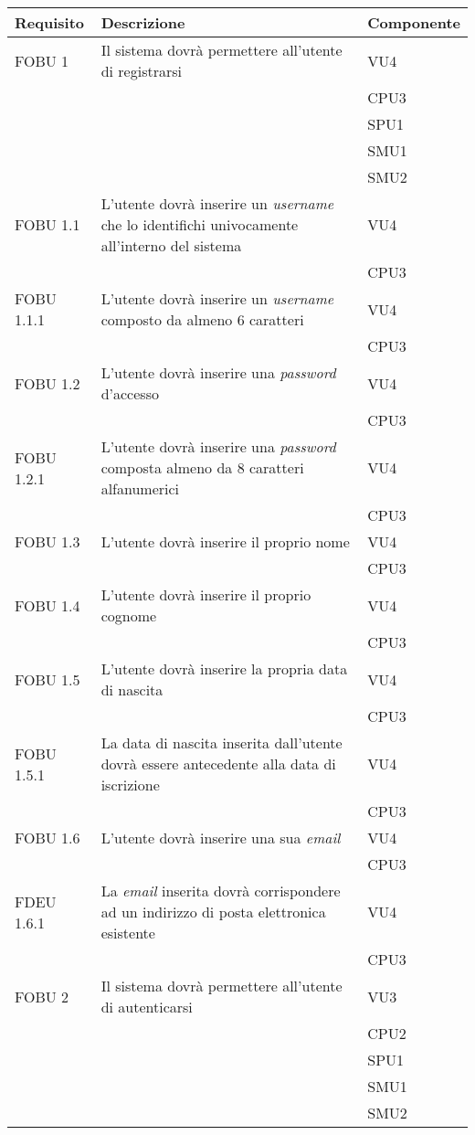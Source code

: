 \begin{longtable}{lXl}
\toprule
\textbf{Requisito} & \textbf{Descrizione} & \textbf{Componente}\\
\toprule
FOBU 1&Il sistema dovrà permettere all'utente di registrarsi&VU4\\
&&CPU3\\
&&SPU1\\
&&SMU1\\
&&SMU2\\
\midrule
FOBU 1.1&L'utente dovrà inserire un \textit{username} che lo identifichi univocamente all'interno del sistema&VU4\\
&&CPU3\\
\midrule
FOBU 1.1.1&L'utente dovrà inserire un \textit{username} composto da almeno 6 caratteri &VU4\\
&&CPU3\\
\midrule
FOBU 1.2&L'utente dovrà inserire una \textit{password} d'accesso&VU4\\
&&CPU3\\
\midrule
FOBU 1.2.1&L'utente dovrà inserire una \textit{password} composta almeno da 8 caratteri alfanumerici&VU4\\
&&CPU3\\
\midrule
FOBU 1.3&L'utente dovrà inserire il proprio nome&VU4\\
&&CPU3\\
\midrule
FOBU 1.4&L'utente dovrà inserire il proprio cognome&VU4\\
&&CPU3\\
\midrule
FOBU 1.5&L'utente dovrà inserire la propria data di nascita&VU4\\
&&CPU3\\
\midrule
FOBU 1.5.1&La data di nascita inserita dall'utente dovrà essere antecedente alla data di iscrizione&VU4\\
&&CPU3\\
\midrule
FOBU 1.6&L'utente dovrà inserire una sua \textit{email}&VU4\\
&&CPU3\\
\midrule
FDEU 1.6.1&La \textit{email} inserita dovrà corrispondere ad un indirizzo di posta elettronica esistente&VU4\\
&&CPU3\\
\midrule
FOBU 2&Il sistema dovrà permettere all'utente di autenticarsi&VU3\\
&&CPU2\\
&&SPU1\\
&&SMU1\\
&&SMU2\\

\end{longtable}
